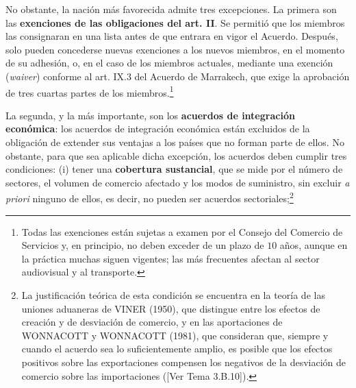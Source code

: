 \documentclass[10pt,a4paper]{article}
\newcommand{\authorfont}[1]{{\fontfamily{EBGaramond-TLF}\selectfont #1}}
\begin{document}
No obstante, la nación más favorecida admite tres excepciones. La primera son las \textbf{exenciones de las obligaciones del art. II}. Se permitió que los miembros las consignaran en una lista antes de que entrara en vigor el Acuerdo. Después, solo pueden concederse nuevas exenciones a los nuevos miembros, en el momento de su adhesión, o, en el caso de los miembros actuales, mediante una exención (\textit{waiver}) conforme al art. IX.3 del Acuerdo de Marrakech, que exige la aprobación de tres cuartas partes de los miembros.\footnote{%
  Todas las exenciones están sujetas a examen por el Consejo del Comercio de Servicios y, en principio, no deben exceder de un plazo de $10$ años, aunque en la práctica muchas siguen vigentes; las más frecuentes afectan al sector audiovisual y al transporte.
}

La segunda, y la más importante, son los \textbf{acuerdos de integración económica}: los acuerdos de integración económica están excluidos de la obligación de extender sus ventajas a los países que no forman parte de ellos. No obstante, para que sea aplicable dicha excepción, los acuerdos deben cumplir tres condiciones: (i) tener una \textbf{cobertura sustancial}, que se mide por el número de sectores, el volumen de comercio afectado y los modos de suministro, sin excluir \textit{a priori} ninguno de ellos, es decir, no pueden ser acuerdos sectoriales;\footnote{%
  La justificación teórica de esta condición se encuentra en la teoría de las uniones aduaneras de VINER (1950), que distingue entre los efectos de creación y de desviación de comercio, y en las aportaciones de WONNACOTT y WONNACOTT (1981), que consideran que, siempre y cuando el acuerdo sea lo suficientemente amplio, es posible que los efectos positivos sobre las exportaciones compensen los negativos de la desviación de comercio sobre las importaciones ([\authorfont{Ver Tema 3.B.10}]).

}
\end{document}

